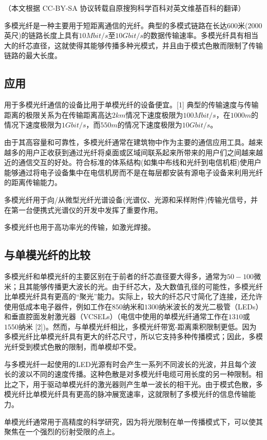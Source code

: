 （本文根据 CC-BY-SA 协议转载自原搜狗科学百科对英文维基百科的翻译）

多模光纤是一种主要用于短距离通信的光纤。典型的多模式链路在长达$600$米($2000$英尺)的链路长度上具有$10 Mbit/s$至$10 Gbit/s$的数据传输速率。多模光纤具有相当大的纤芯直径，这就使得其能够传播多种光模式，并且由于模式色散而限制了传输链路的最大长度。

\subsection{应用}
用于多模光纤通信的设备比用于单模光纤的设备便宜。[1] 典型的传输速度与传输距离的极限关系为在传输距离高达$2km$情况下速度极限为$100 Mbit/s$，在$1000m$的情况下速度极限为$1 Gbit/s$，而$550m$的情况下速度极限为$10 Gbit/s$。

由于其高容量和可靠性，多模光纤通常在建筑物中作为主要的通信应用工具。越来越多的用户正收获到通过光纤将桌面或区域间联系起来所带来的用户们之间越来越近的通信交互的好处。符合标准的体系结构(如集中布线和光纤到电信机柜)使用户能够通过将电子设备集中在电信机房而不是在每层都安装有源电子设备来利用光纤的距离传输能力。

多模光纤用于向/从微型光纤光谱设备(光谱仪、光源和采样附件)传输光信号，并在第一台便携式光谱仪的开发中发挥了重要作用。

多模光纤也用于高功率光的传输，如激光焊接。
\subsection{与单模光纤的比较}
多模光纤和单模光纤的主要区别在于前者的纤芯直径要大得多，通常为$50-100$微米；且其能够传播更大波长的光。由于纤芯大，及大数值孔径的可能性，多模光纤比单模光纤具有更高的“聚光”能力。实际上，较大的纤芯尺寸简化了连接，还允许使用低成本电子器件，例如工作在$850$纳米和$1300$纳米波长的发光二极管（LEDs）和垂直腔面发射激光器（VCSELs）（电信中使用的单模光纤通常工作在$1310$或$1550$纳米 [2])。然而，与单模光纤相比，多模光纤带宽-距离乘积限制更低。因为多模光纤比单模光纤具有更大的纤芯尺寸，所以它支持多种传播模式；因此，多模光纤受到模式色散的限制，而单模却不受。

与多模光纤一起使用的LED光源有时会产生一系列不同波长的光波，并且每个波长的波以不同的速度传播。这种色散是对多模光纤电缆可用长度的另一种限制。相比之下，用于驱动单模光纤的激光器则产生单一波长的相干光。由于模式色散，多模光纤比单模光纤具有更高的脉冲展宽速率，这就限制了多模光纤的信息传输能力。

单模光纤通常用于高精度的科学研究，因为将光限制在单一传播模式下，可以使其聚焦在一个强烈的衍射受限的点上。

